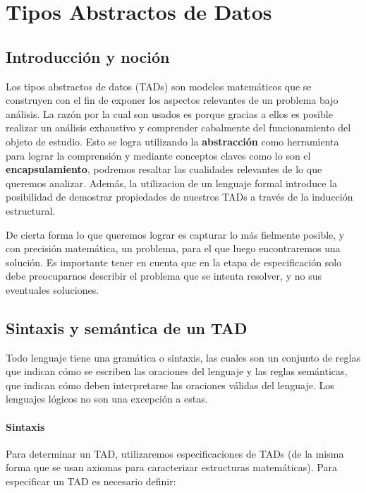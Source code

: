 \chapter{Tipos Abstractos de Datos}

\section{Introducci\'on y noci\'on}
Los tipos abstractos de datos (TADs) son modelos matem\'aticos que se construyen con el fin de exponer los aspectos relevantes de un problema bajo an\'alisis. La raz\'on por la cual son usados es porque gracias a ellos es posible realizar un an\'alisis exhaustivo y comprender cabalmente del funcionamiento del objeto de estudio. Esto se logra utilizando la \textbf{abstracci\'on} como herramienta para lograr la comprensi\'on y mediante conceptos claves como lo son el \textbf{encapsulamiento}, podremos resaltar las cualidades relevantes de lo que queremos analizar. Adem\'as, la utilizacion de un lenguaje formal introduce la posibilidad de demostrar propiedades de nuestros TADs a trav\'es de la inducci\'on estructural.

De cierta forma lo que queremos lograr es capturar lo m\'as fielmente posible, y con precisi\'on matem\'atica, un problema, para el que luego encontraremos una soluci\'on. Es importante tener en cuenta que en la etapa de especificaci\'on solo debe preocuparnos describir el problema que se intenta resolver, y no sus eventuales soluciones.

\section{Sintaxis y sem\'antica de un TAD}

Todo lenguaje tiene una gram\'atica o sintaxis, las cuales son un conjunto de reglas que indican c\'omo se escriben las oraciones del lenguaje y las reglas sem\'anticas, que indican c\'omo deben interpretarse las oraciones v\'alidas del lenguaje. Los lenguajes l\'ogicos no son una excepci\'on a estas.

\subsubsection*{Sintaxis}

Para determinar un TAD, utilizaremos especificaciones de TADs (de la misma forma que se usan axiomas para caracterizar estructuras matem\'aticas). Para especificar un TAD es necesario definir:

